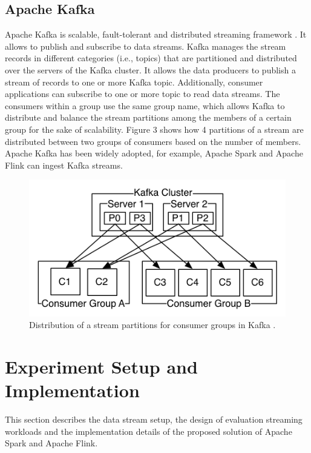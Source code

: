 \documentclass[]{article}
\begin{document}
\subsection{Apache Kafka}
\par Apache Kafka is scalable, fault-tolerant and distributed streaming framework \cite{kafka}. It allows to publish and subscribe to data streams.
Kafka manages the stream records in different categories (i.e., topics) that are partitioned and distributed over the servers of the Kafka cluster. It allows the data producers to publish a stream of records to one or more  Kafka topic. Additionally, consumer applications can subscribe to one or more topic to read data streams. The consumers within a group use the  same group name, which allows Kafka to distribute and balance the stream partitions among the  members of a certain group for the sake of scalability. Figure 3 shows how 4 partitions of a stream are distributed between two groups of consumers based on the number of members. 
Apache Kafka has been widely  adopted, for example, 
Apache Spark and Apache Flink can ingest Kafka streams. 

\begin{figure}[h]
 
  \centering
    \includegraphics[width=\textwidth, height=.4\textheight]{kafka_groups.png}
     \caption{ Distribution of a stream partitions for consumer groups in Kafka \cite{kafka}.}
\end{figure} 

\newpage
\section{Experiment Setup and Implementation}
This section describes the data stream setup, the design of evaluation streaming workloads and the  implementation details of the proposed solution of Apache Spark and Apache Flink.
\end{document}
